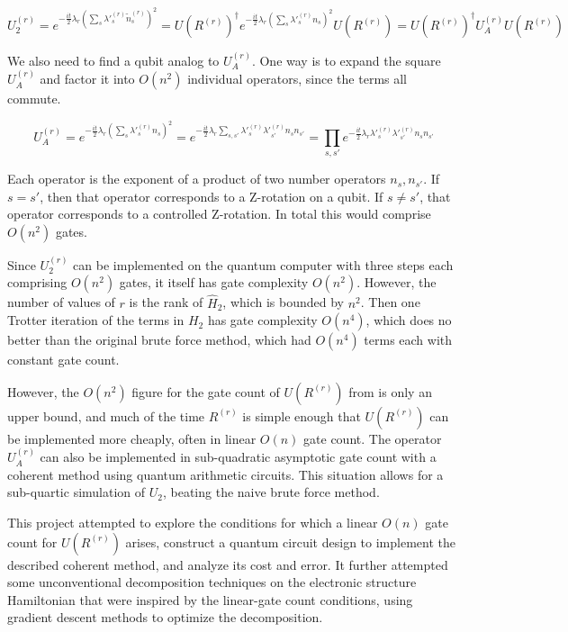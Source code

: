 \begin{equation}
    U_2^{(r)} = e^{-\frac{it}{2}\lambda_r\left(\sum_s \lambda'^{(r)}_s \tilde{n}^{(r)}_s\right)^2} = U(R^{(r)})^\dag e^{-\frac{it}{2}\lambda_r\left(\sum_s \lambda'^{(r)}_s n_s\right)^2}U(R^{(r)}) = U(R^{(r)})^\dag U_A^{(r)}U(R^{(r)})
\end{equation}

We also need to find a qubit analog to $U_A^{(r)}$. One way is to expand the square $U_A^{(r)}$ and factor it into $O(n^2)$ individual operators, since the terms all commute.

\begin{equation}
    U_A^{(r)} = e^{-\frac{it}{2}\lambda_r\left(\sum_s \lambda'^{(r)}_s n_s\right)^2} = e^{-\frac{it}{2}\lambda_r\sum_{s, s'} \lambda'^{(r)}_s\lambda'^{(r)}_{s'} n_sn_{s'}} = \prod_{s, s'} e^{-\frac{it}{2}\lambda_r\lambda'^{(r)}_s\lambda'^{(r)}_{s'} n_sn_{s'}}
    \label{eq: U_A}
\end{equation}

Each operator is the exponent of a product of two number operators $n_s, n_{s'}$. If $s = s'$, then that operator corresponds to a Z-rotation on a qubit. If $s \neq s'$, that operator corresponds to a controlled Z-rotation. In total this would comprise $O(n^2)$ gates.

Since $U_2^{(r)}$ can be implemented on the quantum computer with three steps each comprising $O(n^2)$ gates, it itself has gate complexity $O(n^2)$. However, the number of values of $r$ is the rank of $\hat{H}_2$, which is bounded by $n^2$. Then one Trotter iteration of the terms in $H_2$ has gate complexity $O(n^4)$, which does no better than the original brute force method, which had $O(n^4)$ terms each with constant gate count.

However, the $O(n^2)$ figure for the gate count of $U(R^{(r)})$ from \cite{FSN} is only an upper bound, and much of the time $R^{(r)}$ is simple enough that $U(R^{(r)})$ can be implemented more cheaply, often in linear $O(n)$ gate count. The operator $U_A^{(r)}$ can also be implemented in sub-quadratic asymptotic gate count with a coherent method using quantum arithmetic circuits. This situation allows for a sub-quartic simulation of $U_2$, beating the naive brute force method.

This project attempted to explore the conditions for which a linear $O(n)$ gate count for $U(R^{(r)})$ arises, construct a quantum circuit design to implement the described coherent method, and analyze its cost and error. It further attempted some unconventional decomposition techniques on the electronic structure Hamiltonian that were inspired by the linear-gate count conditions, using gradient descent methods to optimize the decomposition.


